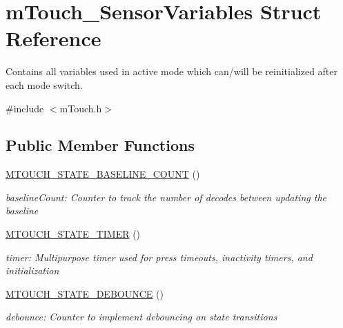\hypertarget{structm_touch___sensor_variables}{}\section{m\+Touch\+\_\+\+Sensor\+Variables Struct Reference}
\label{structm_touch___sensor_variables}


Contains all variables used in active mode which can/will be reinitialized after each mode switch.  




{\ttfamily \#include $<$m\+Touch.\+h$>$}

\subsection*{Public Member Functions}
\begin{DoxyCompactItemize}
\item 
\hyperlink{structm_touch___sensor_variables_aa0d135c47b4653b992ce9e2cd3ba7306}{M\+T\+O\+U\+C\+H\+\_\+\+S\+T\+A\+T\+E\+\_\+\+B\+A\+S\+E\+L\+I\+N\+E\+\_\+\+C\+O\+U\+N\+T} ()
\begin{DoxyCompactList}\small\item\em \textquotesingle{}baseline\+Count\textquotesingle{}\+: Counter to track the number of decodes between updating the baseline \end{DoxyCompactList}\item 
\hyperlink{structm_touch___sensor_variables_af643b008386625cdd4d5e6a8d0ac09de}{M\+T\+O\+U\+C\+H\+\_\+\+S\+T\+A\+T\+E\+\_\+\+T\+I\+M\+E\+R} ()
\begin{DoxyCompactList}\small\item\em \textquotesingle{}timer\textquotesingle{}\+: Multipurpose timer used for press timeouts, inactivity timers, and initialization \end{DoxyCompactList}\item 
\hyperlink{structm_touch___sensor_variables_addf99d6baedf93da7358215ab00888e6}{M\+T\+O\+U\+C\+H\+\_\+\+S\+T\+A\+T\+E\+\_\+\+D\+E\+B\+O\+U\+N\+C\+E} ()
\begin{DoxyCompactList}\small\item\em \textquotesingle{}debounce\textquotesingle{}\+: Counter to implement debouncing on state transitions \end{DoxyCompactList}\end{DoxyCompactItemize}
